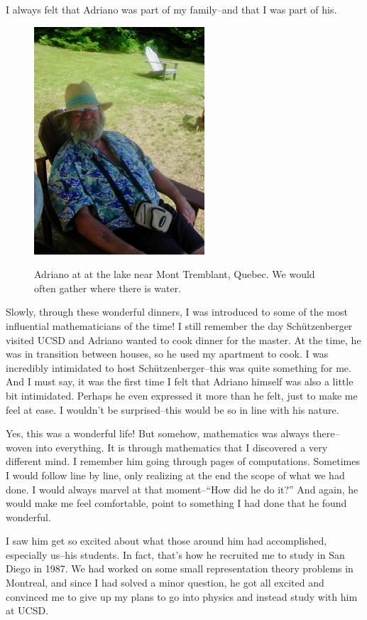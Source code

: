 \documentclass{notices}
\begin{document}
I always felt that Adriano was part of my family--and that I was part of his. 

\begin{figure}[h]
\begin{center}
\includegraphics[width=2.5in]{Nantel_Bergeron/DSCN3064.jpeg}
\end{center}
{\footnotesize Adriano at at the lake near Mont Tremblant, Quebec. We would often gather where there is water.}
\end{figure}

Slowly, through these wonderful dinners, I was introduced to some of the most influential mathematicians of the time! I still remember the day Schützenberger visited UCSD and Adriano wanted to cook dinner for the master. At the time, he was in transition between houses, so he used my apartment to cook. I was incredibly intimidated to host Schützenberger--this was quite something for me. And I must say, it was the first time I felt that Adriano himself was also a little bit intimidated. Perhaps he even expressed it more than he felt, just to make me feel at ease. I wouldn't be surprised--this would be so in line with his nature.

Yes, this was a wonderful life! But somehow, mathematics was always there--woven into everything. It is through mathematics that I discovered a very different mind. I remember him going through pages of computations. Sometimes I would follow line by line, only realizing at the end the scope of what we had done. I would always marvel at that moment--``How did he do it?'' And again, he would make me feel comfortable, point to something I had done that he found wonderful.

I saw him get so excited about what those around him had accomplished, especially us--his students. In fact, that's how he recruited me to study in San Diego in 1987. We had worked on some small representation theory problems in Montreal, and since I had solved a minor question, he got all excited and convinced me to give up my plans to go into physics and instead study with him at UCSD.
\end{document}
